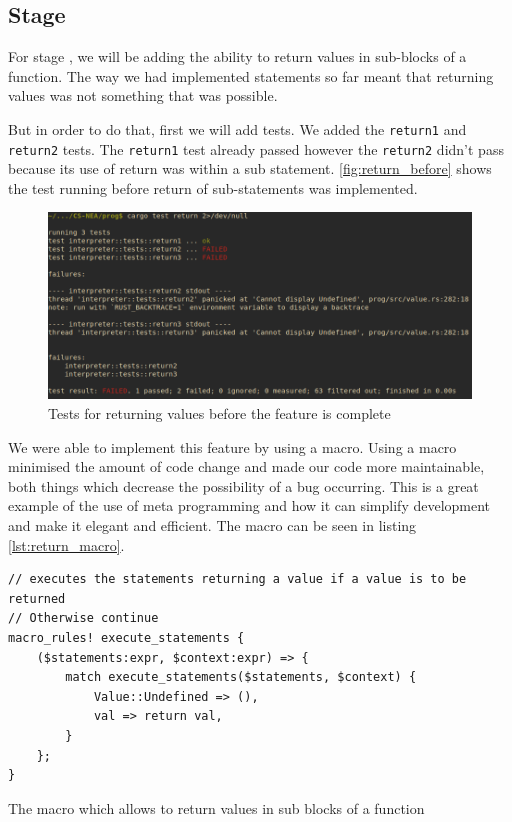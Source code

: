 \documentclass{article}
\newcommand{\subsecnum}{\the\value{subsection}}
\begin{document}
\subsection{Stage \subsecnum}

For stage \subsecnum, we will be adding the ability to return values in
sub-blocks of a function. The way we had implemented statements so far meant
that returning values was not something that was possible.

But in order to do that, first we will add tests. We added the \texttt{return1}
and \texttt{return2} tests. The \texttt{return1} test already passed however
the \texttt{return2} didn't pass because its use of return was within a sub
statement. \autoref{fig:return_before} shows the test running before return of
sub-statements was implemented.

\begin{figure}
	\includegraphics[width=\textwidth]{return_before}
	\caption{Tests for returning values before the feature is complete}
	\label{fig:return_before}
\end{figure}

We were able to implement this feature by using a macro. Using a macro
minimised the amount of code change and made our code more maintainable, both
things which decrease the possibility of a bug occurring. This is a great
example of the use of meta programming and how it can simplify development and
make it elegant and efficient. The macro can be seen in listing
\ref{lst:return_macro}.

\begin{listing}
	\begin{verbatim}
// executes the statements returning a value if a value is to be returned
// Otherwise continue
macro_rules! execute_statements {
    ($statements:expr, $context:expr) => {
        match execute_statements($statements, $context) {
            Value::Undefined => (),
            val => return val,
        }
    };
}
	\end{verbatim}
	\caption{The macro which allows to return values in sub blocks of a
	function}
	\label{lst:return_macro}
\end{listing}
\end{document}
